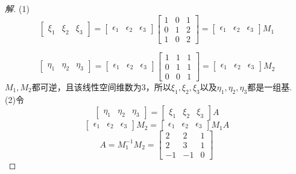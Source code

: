 \documentclass[10pt,a4paper]{report}
\begin{document}
\begin{proof}[解]
	(1)
	$$\left[
	\begin{matrix}
	\xi_{1} & \xi_{2} & \xi_{3}
	\end{matrix}
	\right] = \left[
	\begin{matrix}
	\epsilon_{1} & \epsilon_{2} & \epsilon_{3}
	\end{matrix}
	\right]\left[
	\begin{matrix}
	1 & 0 & 1\\
	0 & 1 & 2\\
	1 & 0 & 2
	\end{matrix}
	\right] = \left[
	\begin{matrix}
	\epsilon_{1} & \epsilon_{2} & \epsilon_{3}
	\end{matrix}
	\right]M_{1}$$
	
	$$\left[
	\begin{matrix}
	\eta_{1} & \eta_{2} & \eta_{3}
	\end{matrix}
	\right] = \left[
	\begin{matrix}
	\epsilon_{1} & \epsilon_{2} & \epsilon_{3}
	\end{matrix}
	\right]\left[
	\begin{matrix}
	1 & 1 & 1\\
	0 & 1 & 1\\
	0 & 0 & 1
	\end{matrix}
	\right] = \left[
	\begin{matrix}
	\epsilon_{1} & \epsilon_{2} & \epsilon_{3}
	\end{matrix}
	\right]M_{2}$$
	$M_{1},M_{2}$都可逆，且该线性空间维数为3，所以$\xi_{1} , \xi_{2} , \xi_{3}$以及$\eta_{1} , \eta_{2} , \eta_{3}$都是一组基.\\
	(2)令
	$$\left[
	\begin{matrix}
	\eta_{1} & \eta_{2} & \eta_{3}
	\end{matrix}
	\right] = \left[
	\begin{matrix}
	\xi_{1} & \xi_{2} & \xi_{3}
	\end{matrix}
	\right]A$$
	$$
	\left[
	\begin{matrix}
	\epsilon_{1} & \epsilon_{2} & \epsilon_{3}
	\end{matrix}
	\right]M_{2} = \left[
	\begin{matrix}
	\epsilon_{1} & \epsilon_{2} & \epsilon_{3}
	\end{matrix}
	\right]M_{1}A
	$$
	$$A = M_{1}^{-1}M_{2} = \left[
	\begin{matrix}
	2 & 2 & 1\\
	2 & 3 & 1\\
	-1 & -1 & 0
	\end{matrix}
	\right]$$
\end{proof}
\end{document}
